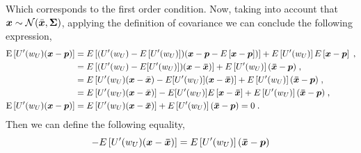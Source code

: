 \documentclass{article}
\begin{document}
Which corresponds to the first order condition. Now, taking into account that $\bm{x}\sim\mathcal{N}(\Bar{\bm{x}},\bm{\Sigma})$, applying the definition of covariance we can conclude the following expression,
\begin{equation*}
	\begin{split}
		\mathrm{E}\left[U'(w_{U})(\bm{x}-\bm{p})\right] &= E\left[(U'(w_U)-E\left[U'(w_U)\right])(\bm{x}-\bm{p}-E\left[\bm{x}-\bm{p}\right])\right] + E\left[U'(w_U)\right]E\left[\bm{x}-\bm{p}\right]\;,\\
		&= E\left[(U'(w_U)-E[U'(w_U)])(\bm{x}-\bm{\Bar{x}})\right]+ E\left[U'(w_U)\right](\bm{\Bar{x}}-\bm{p})\;,\\
		&= E\left[U'(w_U)(\bm{x}-\Bar{\bm{x}})-E[U'(w_U)](\bm{x}-\bm{\Bar{x}})\right]+ E\left[U'(w_U)\right](\bm{\Bar{x}}-\bm{p})\;,\\
		&= E\left[U'(w_U)(\bm{x}-\Bar{\bm{x}})\right]-E[U'(w_U)]E\left[\bm{x}-\bm{\Bar{x}}\right]+ E\left[U'(w_U)\right](\bm{\Bar{x}}-\bm{p})\;,\\
		\mathrm{E}\left[U'(w_{U})(\bm{x}-\bm{p})\right] &= E\left[U'(w_U)(\bm{x}-\bm{\Bar{x}})\right]+ E\left[U'(w_U)\right](\bm{\Bar{x}}-\bm{p})=0\;.
	\end{split}
\end{equation*}
Then we can define the following equality,
\begin{equation*}
	-E\left[U'(w_U)(\bm{x}-\bm{\Bar{x}})\right]= E\left[U'(w_U)\right](\bm{\Bar{x}}-\bm{p})
\end{equation*}
\end{document}
